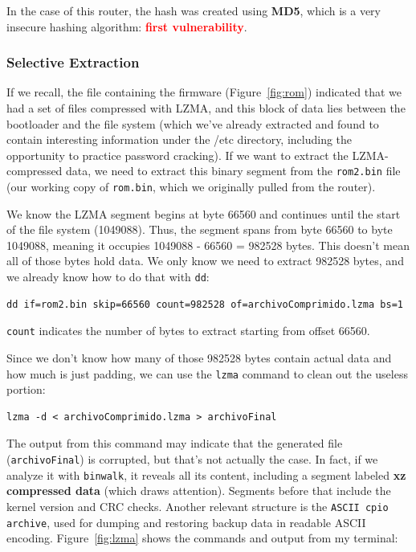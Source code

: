 \documentclass[12pt,a4paper, brazil]{article}
\begin{document}
\begin{tcolorbox}[colback=red!5]
    In the case of this router, the hash was created using \textbf{MD5}, which is a very insecure hashing algorithm: \textbf{\textcolor{red}{first vulnerability}}.
\end{tcolorbox}

\subsubsection{Selective Extraction}

If we recall, the file containing the firmware (Figure~\ref{fig:rom}) indicated that we had a set of files compressed with LZMA, and this block of data lies between the bootloader and the file system (which we’ve already extracted and found to contain interesting information under the /etc directory, including the opportunity to practice password cracking). If we want to extract the LZMA-compressed data, we need to extract this binary segment from the \texttt{rom2.bin} file (our working copy of \texttt{rom.bin}, which we originally pulled from the router).

We know the LZMA segment begins at byte 66560 and continues until the start of the file system (1049088). Thus, the segment spans from byte 66560 to byte 1049088, meaning it occupies 1049088 - 66560 = 982528 bytes. This doesn’t mean all of those bytes hold data. We only know we need to extract 982528 bytes, and we already know how to do that with \texttt{dd}:

\begin{verbatim}
dd if=rom2.bin skip=66560 count=982528 of=archivoComprimido.lzma bs=1
\end{verbatim}

\texttt{count} indicates the number of bytes to extract starting from offset 66560.

Since we don’t know how many of those 982528 bytes contain actual data and how much is just padding, we can use the \texttt{lzma} command to clean out the useless portion:

\begin{verbatim}
lzma -d < archivoComprimido.lzma > archivoFinal
\end{verbatim}

The output from this command may indicate that the generated file (\texttt{archivoFinal}) is corrupted, but that’s not actually the case. In fact, if we analyze it with \texttt{binwalk}, it reveals all its content, including a segment labeled \textbf{xz compressed data} (which draws attention). Segments before that include the kernel version and CRC checks. Another relevant structure is the \texttt{ASCII cpio archive}, used for dumping and restoring backup data in readable ASCII encoding. Figure~\ref{fig:lzma} shows the commands and output from my terminal:
\end{document}
